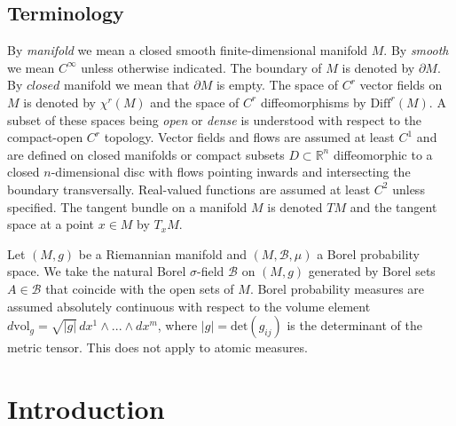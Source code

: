 \documentclass[12pt]{article}
\begin{document}
\subsection*{Terminology}
\label{subsection:terminology}
By \textit{manifold} we mean a closed smooth finite-dimensional manifold $M$. By \textit{smooth} we mean $C^{\infty}$ unless otherwise indicated. The boundary of $M$ is denoted by $\partial M$. By $\textit{closed}$ manifold we mean that $\partial M$ is empty. The space of $C^r$ vector fields on $M$ is denoted by $\chi^r(M)$ and the space of $C^r$ diffeomorphisms by $\text{Diff}^r(M)$. A subset of these spaces being \textit{open} or \textit{dense} is understood with respect to the compact-open $C^r$ topology. Vector fields and flows are assumed at least $C^1$ and are defined on closed manifolds or compact subsets $D \subset \mathbb{R}^n$ diffeomorphic to a closed $n$-dimensional disc with flows pointing inwards and intersecting the boundary transversally. Real-valued functions are assumed at least $C^2$ unless specified. The tangent bundle on a manifold $M$ is denoted $TM$ and the tangent space at a point $x\in M$ by $T_xM$. 

Let $(M,g)$ be a Riemannian manifold and $(M, \mathcal{B}, \mu)$ a Borel probability space. We take the natural Borel $\sigma$-field $\mathcal{B}$ on $(M,g)$ generated by Borel sets $A \in \mathcal{B}$ that coincide with the open sets of $M$. Borel probability measures are assumed absolutely continuous with respect to the volume element $d\text{vol}_g = \sqrt{|g|} \, dx^1 \wedge ...\wedge dx^m$, where $|g| = \text{det}(g_{ij})$ is the determinant of the metric tensor. This does not apply to atomic measures. 


\newpage
\linespread{1}
\section{Introduction}
\label{section:Introduction}
\end{document}
